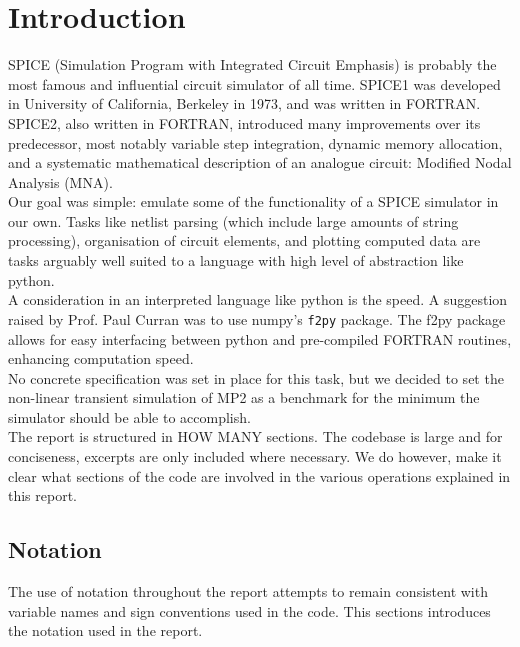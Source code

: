 \section{Introduction}

SPICE (Simulation Program with Integrated Circuit Emphasis) is probably the most famous and influential circuit simulator of all time. SPICE1 was developed in University of California, Berkeley in 1973, and was written in FORTRAN. SPICE2, also written in FORTRAN, introduced many improvements over its predecessor, most notably variable step integration, dynamic memory allocation, and a systematic mathematical description of an analogue circuit: Modified Nodal Analysis (MNA). \\

Our goal was simple: emulate some of the functionality of a SPICE simulator in our own. Tasks like netlist parsing (which include large amounts of string processing), organisation of circuit elements, and plotting computed data are tasks arguably well suited to a language with high level of abstraction like python.\\

A consideration in an interpreted language like python is the speed. A suggestion raised by Prof. Paul Curran was to use numpy's \texttt{f2py} package. The f2py package allows for easy interfacing between python and pre-compiled FORTRAN routines, enhancing computation speed.\\

No concrete specification was set in place for this task, but we decided to set the non-linear transient simulation of MP2 as a benchmark for the minimum the simulator should be able to accomplish.\\

The report is structured in HOW MANY sections. The codebase is large and for conciseness, excerpts are only included where necessary. We do however, make it clear what sections of the code are involved in the various operations explained in this report.\\

\subsection{Notation}
The use of notation throughout the report attempts to remain consistent with variable names and sign conventions used in the code. This sections introduces the notation used in the report.


